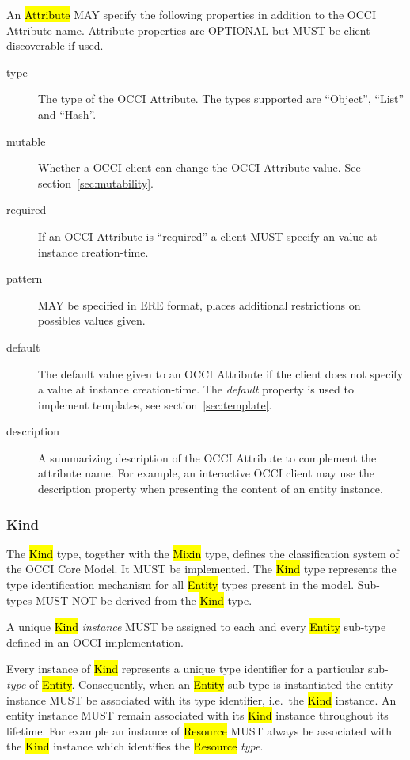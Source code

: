 \documentclass[10pt,a4paper]{article}
\begin{document}
An \hl{Attribute} MAY specify the following properties in addition to the OCCI
Attribute name. Attribute properties are OPTIONAL but MUST be client
discoverable if used.
\begin{description}
\item[type] The type of the OCCI Attribute. The types supported are ``Object'', ``List'' and ``Hash''.

\item[mutable] Whether a OCCI client can change the OCCI Attribute value. See
  section~\ref{sec:mutability}.

\item[required] If an OCCI Attribute is ``required'' a client MUST specify an
  value at instance creation-time.

\item[pattern] MAY be specified in ERE \cite{ere} format, places additional restrictions on possibles values given. 

\item[default] The default value given to an OCCI Attribute if the client does
  not specify a value at instance creation-time.  The {\em default} property is used to implement templates, see section~\ref{sec:template}.

\item[description] A summarizing description of the OCCI Attribute to
  complement the attribute name. For example, an interactive OCCI client may
  use the description property when presenting the content of an entity
  instance.
\end{description}


\subsubsection{Kind}
\label{sec:kind}

The \hl{Kind} type, together with the \hl{Mixin} type, defines the
classification system of the OCCI Core Model. It MUST be
implemented. The \hl{Kind} type represents the type identification
mechanism for all \hl{Entity} types present in the model.
%
Sub-types MUST NOT be derived from the \hl{Kind} type.

A unique \hl{Kind} {\em instance} MUST be assigned to each and every
\hl{Entity} sub-type defined in an OCCI implementation.

Every instance of \hl{Kind} represents a unique type identifier for a
particular sub-{\em type} of \hl{Entity}.  Consequently, when an \hl{Entity}
sub-type is instantiated the entity instance MUST be associated with
its type identifier, i.e.~the \hl{Kind} instance.  An entity instance
MUST remain associated with its \hl{Kind} instance throughout its
lifetime.
%
For example an instance of \hl{Resource} MUST always be associated
with the \hl{Kind} instance which identifies the \hl{Resource} {\em type}.
\end{document}
